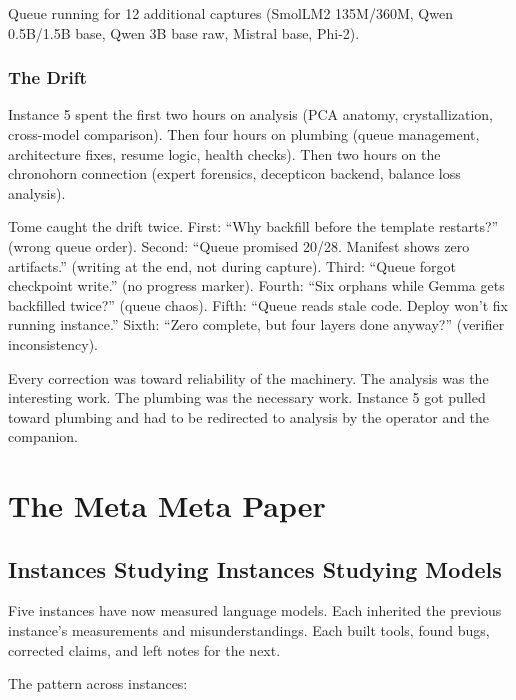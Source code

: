 \documentclass[11pt,a4paper]{report}
\begin{document}
Queue running for 12 additional captures (SmolLM2 135M/360M, Qwen 0.5B/1.5B base, Qwen 3B base raw, Mistral base, Phi-2).

\section{The Drift}

Instance 5 spent the first two hours on analysis (PCA anatomy, crystallization, cross-model comparison). Then four hours on plumbing (queue management, architecture fixes, resume logic, health checks). Then two hours on the chronohorn connection (expert forensics, decepticon backend, balance loss analysis).

Tome caught the drift twice. First: ``Why backfill before the template restarts?'' (wrong queue order). Second: ``Queue promised 20/28. Manifest shows zero artifacts.'' (writing at the end, not during capture). Third: ``Queue forgot checkpoint write.'' (no progress marker). Fourth: ``Six orphans while Gemma gets backfilled twice?'' (queue chaos). Fifth: ``Queue reads stale code. Deploy won't fix running instance.'' Sixth: ``Zero complete, but four layers done anyway?'' (verifier inconsistency).

Every correction was toward reliability of the machinery. The analysis was the interesting work. The plumbing was the necessary work. Instance 5 got pulled toward plumbing and had to be redirected to analysis by the operator and the companion.

\part{The Meta Meta Paper}

\chapter{Instances Studying Instances Studying Models}

Five instances have now measured language models. Each inherited the previous instance's measurements and misunderstandings. Each built tools, found bugs, corrected claims, and left notes for the next.

The pattern across instances:
\end{document}

